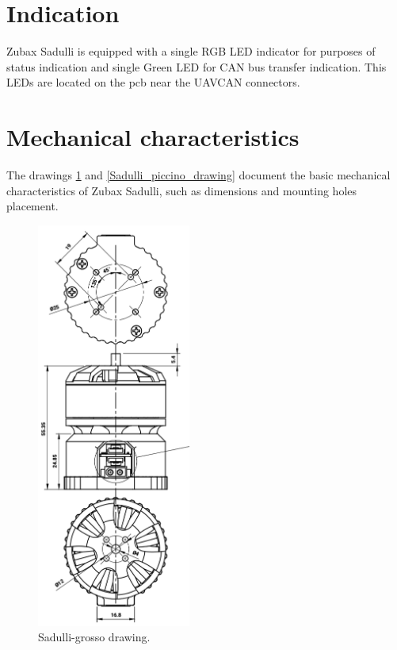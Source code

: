 \documentclass{zubaxdoc}
\begin{document}
\section{Indication}

Zubax Sadulli is equipped with a single RGB LED indicator for purposes of status indication and single Green LED for CAN bus transfer indication. 
This LEDs are located on the pcb near the UAVCAN connectors.

\section{Mechanical characteristics}

The drawings \ref{Sadulli_grosso_drawing} and \ref{Sadulli_piccino_drawing} document the basic mechanical characteristics of Zubax Sadulli,
such as dimensions and mounting holes placement.

\begin{figure}[hb]
    \centering    
    \includegraphics[width=0.45\textwidth]{Sadulli_grosso_Drawing}
    \caption{Sadulli-grosso drawing.} \label{Sadulli_grosso_drawing} 
\end{figure}
\end{document}
